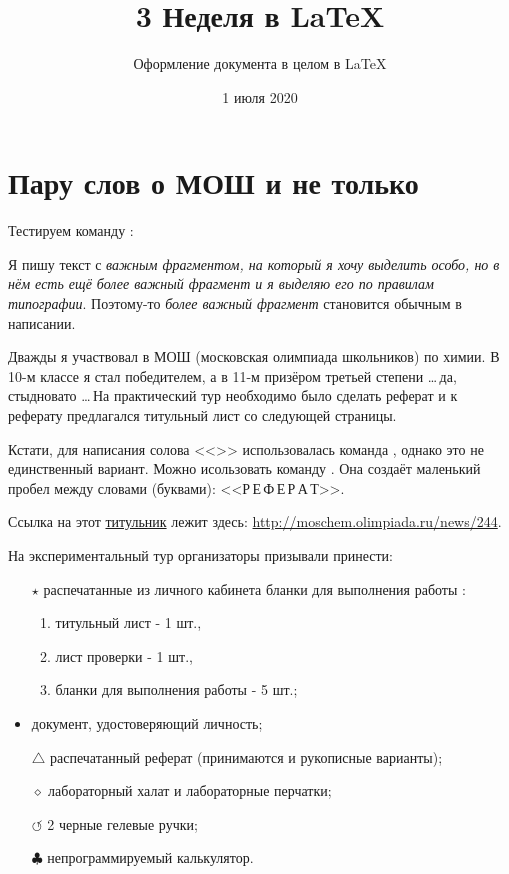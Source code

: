 \documentclass[a4paper,12pt]{article}
\author{Оформление документа в целом в \LaTeX{}}
\title{3 Неделя в \LaTeX}
\date{1 июля 2020}
\theoremstyle{plain} %
\theoremstyle{definition} %
\theoremstyle{remark} %
\begin{document}
\maketitle

\newpage

\section{Пару слов о МОШ и не только}

Тестируем команду :

Я пишу текст с \emph{важным фрагментом, на который я хочу выделить особо, но в нём есть \emph{ещё более важный фрагмент} и я выделяю его по правилам типографии}. Поэтому-то \emph{более важный фрагмент} становится обычным в написании.

Дважды я участвовал в МОШ (московская олимпиада школьников) по химии. В 10-м классе я стал победителем, а в 11-м призёром третьей степени \dots \,да, стыдновато \dots \,На практический тур необходимо было сделать реферат и к реферату предлагался титульный лист со следующей страницы.

Кстати, для написания солова <<>> использовалась команда , однако это не единственный вариант. Можно исользовать команду \text{\emph{$\backslash ,$}}. Она создаёт маленький пробел между словами (буквами): <<Р\,Е\,Ф\,Е\,Р\,А\,Т>>.

Ссылка на этот \href{http://moschem.olimpiada.ru/news/244}{титульник} лежит здесь: \url{http://moschem.olimpiada.ru/news/244}. %

На экспериментальный тур организаторы призывали принести:

\begin{itemize}
\item[$\star$] распечатанные из личного кабинета бланки для выполнения работы :
\begin{enumerate}
\item титульный лист - 1 шт.,
\item лист проверки - 1 шт.,
\item бланки для выполнения работы - 5 шт.; 
\end{enumerate}

\item документ, удостоверяющий личность; 

\item[$\bigtriangleup$] распечатанный реферат (принимаются и рукописные варианты);

\item[$\diamond$] лабораторный халат и лабораторные перчатки;

\item[$\circlearrowleft$] 2 черные гелевые ручки;

\item[$\clubsuit$] непрограммируемый калькулятор.\\
\end{itemize}
\end{document}
